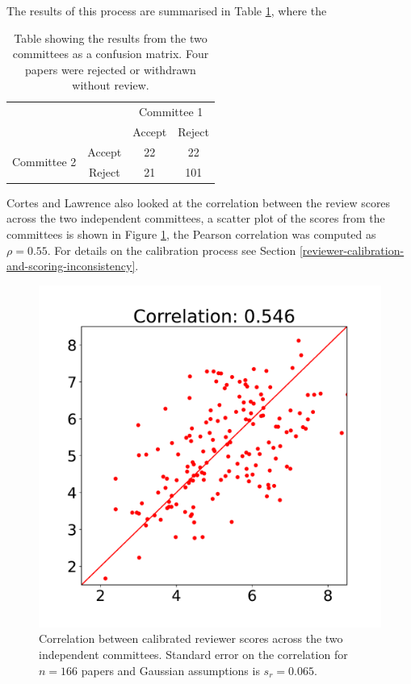 \documentclass[twoside]{article}
\begin{document}
The results of this process are summarised in Table \ref{table-neurips-experiment-results}, where the
\begin{table}[htb]
\caption{Table showing the results from the two committees as a confusion matrix. Four papers were rejected or withdrawn without review.}
\label{table-neurips-experiment-results}

\begin{tabular}{lc|c|c|}
& & \multicolumn{2}{c}{Committee 1} \\
& & Accept & Reject \\ \hline
\multirow{2}{*}{Committee 2} & Accept & 22 & 22 \\
& Reject & 21 & 101 
\end{tabular}
\end{table}

Cortes and Lawrence also looked at the correlation between the review scores across the two independent committees, a scatter plot of the scores from the committees is shown in Figure \ref{figure-calibrated-quality-correlation}, the Pearson correlation was computed as $\rho=0.55$. For details on the calibration process see Section \ref{reviewer-calibration-and-scoring-inconsistency}.

\begin{figure}[htb]
\includegraphics[width=0.9\columnwidth]{diagrams/neurips/calibrated-quality-correlation.pdf}

\caption{Correlation between calibrated reviewer scores across the two independent committees. Standard error on the correlation for $n=166$ papers and Gaussian assumptions is $s_r = 0.065$.}
\label{figure-calibrated-quality-correlation}
\end{figure}
\end{document}
